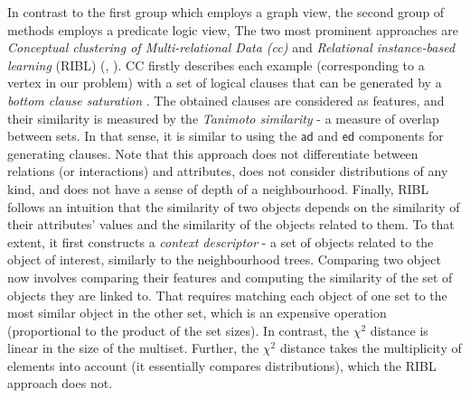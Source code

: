 In contrast to the first group which employs a graph view, the second group of methods employs a predicate logic view,
The two most prominent approaches are \textit{Conceptual clustering of Multi-relational Data (\gls{cc})} \cite{Fonseca2012} and \textit{Relational instance-based learning} (RIBL) (\cite{RIBL96}, \cite{Kirsten98relationaldistance-based}).
CC firstly describes each example (corresponding to a vertex in our problem) with a set of logical clauses that can be generated by a \textit{bottom clause saturation} \cite{CamachoFRC07}.
The obtained clauses are considered as features, and their similarity is measured by  the \textit{Tanimoto similarity} - a measure of overlap between sets.
In that sense, it is similar to using the $\mathsf{ad}$ and $\mathsf{ed}$ components for generating clauses.
Note that this approach does not differentiate between relations (or interactions) and attributes, does not consider distributions of any kind, and does not have a sense of depth of a neighbourhood.
Finally, RIBL follows an intuition that the similarity  of two objects depends on the similarity of their attributes' values and the similarity of the objects related to them.
To that extent, it first constructs a \textit{context descriptor} - a set of objects related to the object of interest, similarly to the neighbourhood trees.
Comparing two object now involves comparing their features and computing the similarity of the set of objects they are linked to.
That requires matching each object of one set to the most similar object in the other set, which is an expensive operation (proportional to the product of the set sizes).
In contrast, the $\chi^2$ distance is linear in the size of the multiset.
Further, the $\chi^2$ distance takes the multiplicity of elements into account (it essentially compares distributions), which the RIBL approach does not.



